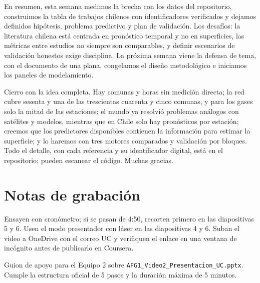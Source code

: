 En resumen, esta semana medimos la brecha con los datos del repositorio, construimos la tabla de trabajos chilenos con identificadores verificados y dejamos definidos hipótesis, problema predictivo y plan de validación.  Los desafíos: la literatura chilena está centrada en pronóstico temporal y no en superficies, las métricas entre estudios no siempre son comparables, y definir escenarios de validación honestos exige disciplina.  La próxima semana viene la defensa de tema, con el documento de una plana, congelamos el diseño metodológico e iniciamos los paneles de modelamiento.

Cierro con la idea completa. Hay comunas y horas sin medición directa; la red cubre sesenta y una de las trescientas cuarenta y cinco comunas, y para los gases solo la mitad de las estaciones; el mundo ya resolvió problemas análogos con satélites y modelos, mientras que en Chile solo hay pronósticos por estación; creemos que los predictores disponibles contienen la información para estimar la superficie; y lo haremos con tres motores comparados y validación por bloques. Todo el detalle, con cada referencia y su identificador digital, está en el repositorio; pueden escanear el código. Muchas gracias.

\section{Notas de grabación}

\begin{nota}
\small
Ensayen con cronómetro; si se pasan de 4:50, recorten primero en las diapositivas 5 y 6. Usen el modo presentador con láser en las diapositivas 4 y 6. Suban el video a OneDrive con el correo UC y verifiquen el enlace en una ventana de incógnito antes de publicarlo en Coursera.
\end{nota}

\vspace{0.4cm}
{\color{gris}\small Guion de apoyo para el Equipo 2 sobre \texttt{AFG1\_Video2\_Presentacion\_UC.pptx}. Cumple la estructura oficial de 5 pasos y la duración máxima de 5 minutos.\par}


